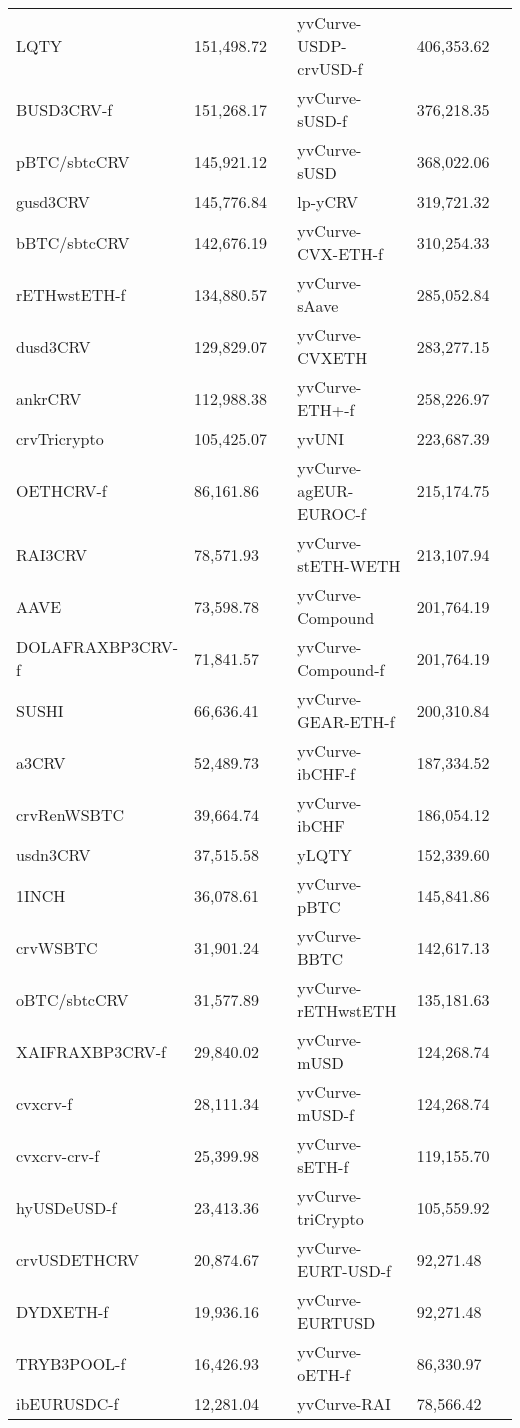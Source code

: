 \begin{longtable}{@{}p{0.25\linewidth}p{0.25\linewidth}p{0.25\linewidth}p{0.25\linewidth}@{}}
LQTY & 151,498.72 & yvCurve-USDP-crvUSD-f & 406,353.62 \\
BUSD3CRV-f & 151,268.17 & yvCurve-sUSD-f & 376,218.35 \\
pBTC/sbtcCRV & 145,921.12 & yvCurve-sUSD & 368,022.06 \\
gusd3CRV & 145,776.84 & lp-yCRV & 319,721.32 \\
bBTC/sbtcCRV & 142,676.19 & yvCurve-CVX-ETH-f & 310,254.33 \\
rETHwstETH-f & 134,880.57 & yvCurve-sAave & 285,052.84 \\
dusd3CRV & 129,829.07 & yvCurve-CVXETH & 283,277.15 \\
ankrCRV & 112,988.38 & yvCurve-ETH+-f & 258,226.97 \\
crvTricrypto & 105,425.07 & yvUNI & 223,687.39 \\
OETHCRV-f & 86,161.86 & yvCurve-agEUR-EUROC-f & 215,174.75 \\
RAI3CRV & 78,571.93 & yvCurve-stETH-WETH & 213,107.94 \\
AAVE & 73,598.78 & yvCurve-Compound & 201,764.19 \\
DOLAFRAXBP3CRV-f & 71,841.57 & yvCurve-Compound-f & 201,764.19 \\
SUSHI & 66,636.41 & yvCurve-GEAR-ETH-f & 200,310.84 \\
a3CRV & 52,489.73 & yvCurve-ibCHF-f & 187,334.52 \\
crvRenWSBTC & 39,664.74 & yvCurve-ibCHF & 186,054.12 \\
usdn3CRV & 37,515.58 & yLQTY & 152,339.60 \\
1INCH & 36,078.61 & yvCurve-pBTC & 145,841.86 \\
crvWSBTC & 31,901.24 & yvCurve-BBTC & 142,617.13 \\
oBTC/sbtcCRV & 31,577.89 & yvCurve-rETHwstETH & 135,181.63 \\
XAIFRAXBP3CRV-f & 29,840.02 & yvCurve-mUSD & 124,268.74 \\
cvxcrv-f & 28,111.34 & yvCurve-mUSD-f & 124,268.74 \\
cvxcrv-crv-f & 25,399.98 & yvCurve-sETH-f & 119,155.70 \\
hyUSDeUSD-f & 23,413.36 & yvCurve-triCrypto & 105,559.92 \\
crvUSDETHCRV & 20,874.67 & yvCurve-EURT-USD-f & 92,271.48 \\
DYDXETH-f & 19,936.16 & yvCurve-EURTUSD & 92,271.48 \\
TRYB3POOL-f & 16,426.93 & yvCurve-oETH-f & 86,330.97 \\
ibEURUSDC-f & 12,281.04 & yvCurve-RAI & 78,566.42 \\

\end{longtable}
